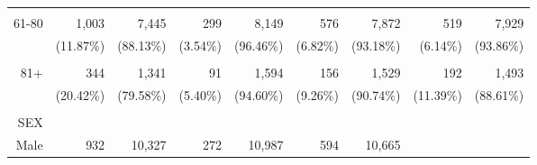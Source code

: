 \documentclass{article}
\begin{document}
\begin{tabular}{lllllllll}
  \multicolumn{1}{r}{} &
  \multicolumn{1}{r}{} &
  \multicolumn{1}{r}{} &
  \multicolumn{1}{r}{} &
  \multicolumn{1}{r}{} &
  \multicolumn{1}{r}{} \\
\multicolumn{1}{r}{61-80\hspace{1em}} &
  \multicolumn{1}{|r}{1,003} &
  \multicolumn{1}{r}{7,445} &
  \multicolumn{1}{r}{299} &
  \multicolumn{1}{r}{8,149} &
  \multicolumn{1}{r}{576} &
  \multicolumn{1}{r}{7,872} &
  \multicolumn{1}{r}{519} &
  \multicolumn{1}{r}{7,929} \\
\multicolumn{1}{r}{} &
  \multicolumn{1}{|r}{(11.87\%)} &
  \multicolumn{1}{r}{(88.13\%)} &
  \multicolumn{1}{r}{(3.54\%)} &
  \multicolumn{1}{r}{(96.46\%)} &
  \multicolumn{1}{r}{(6.82\%)} &
  \multicolumn{1}{r}{(93.18\%)} &
  \multicolumn{1}{r}{(6.14\%)} &
  \multicolumn{1}{r}{(93.86\%)} \\
\multicolumn{1}{r}{} &
  \multicolumn{1}{|r}{} &
  \multicolumn{1}{r}{} &
  \multicolumn{1}{r}{} &
  \multicolumn{1}{r}{} &
  \multicolumn{1}{r}{} &
  \multicolumn{1}{r}{} &
  \multicolumn{1}{r}{} &
  \multicolumn{1}{r}{} \\
\multicolumn{1}{r}{81+\hspace{1em}} &
  \multicolumn{1}{|r}{344} &
  \multicolumn{1}{r}{1,341} &
  \multicolumn{1}{r}{91} &
  \multicolumn{1}{r}{1,594} &
  \multicolumn{1}{r}{156} &
  \multicolumn{1}{r}{1,529} &
  \multicolumn{1}{r}{192} &
  \multicolumn{1}{r}{1,493} \\
\multicolumn{1}{r}{} &
  \multicolumn{1}{|r}{(20.42\%)} &
  \multicolumn{1}{r}{(79.58\%)} &
  \multicolumn{1}{r}{(5.40\%)} &
  \multicolumn{1}{r}{(94.60\%)} &
  \multicolumn{1}{r}{(9.26\%)} &
  \multicolumn{1}{r}{(90.74\%)} &
  \multicolumn{1}{r}{(11.39\%)} &
  \multicolumn{1}{r}{(88.61\%)} \\
\multicolumn{1}{r}{} &
  \multicolumn{1}{|r}{} &
  \multicolumn{1}{r}{} &
  \multicolumn{1}{r}{} &
  \multicolumn{1}{r}{} &
  \multicolumn{1}{r}{} &
  \multicolumn{1}{r}{} &
  \multicolumn{1}{r}{} &
  \multicolumn{1}{r}{} \\
\multicolumn{1}{r}{SEX} &
  \multicolumn{1}{|r}{} &
  \multicolumn{1}{r}{} &
  \multicolumn{1}{r}{} &
  \multicolumn{1}{r}{} &
  \multicolumn{1}{r}{} &
  \multicolumn{1}{r}{} &
  \multicolumn{1}{r}{} &
  \multicolumn{1}{r}{} \\
\multicolumn{1}{r}{Male\hspace{1em}} &
  \multicolumn{1}{|r}{932} &
  \multicolumn{1}{r}{10,327} &
  \multicolumn{1}{r}{272} &
  \multicolumn{1}{r}{10,987} &
  \multicolumn{1}{r}{594} &
  \multicolumn{1}{r}{10,665} &

\end{tabular}
\end{document}
